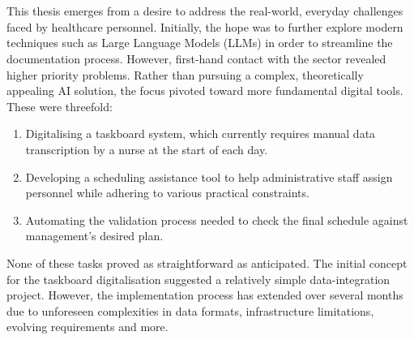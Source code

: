 \\
\\
This thesis emerges from a desire to address the real-world, everyday challenges faced by healthcare personnel. Initially, the hope was to further explore modern techniques such as Large Language Models (LLMs) in order to streamline the documentation process. However, first-hand contact with the sector revealed higher priority problems. Rather than pursuing a complex, theoretically appealing AI solution, the focus pivoted toward more fundamental digital tools. These were threefold:
\begin{enumerate}
    \item Digitalising a taskboard system, which currently requires manual data transcription by a nurse at the start of each day.
    \item Developing a scheduling assistance tool to help administrative staff assign personnel while adhering to various practical constraints.
    \item Automating the validation process needed to check the final schedule against management's desired plan.
\end{enumerate}
None of these tasks proved as straightforward as anticipated. The initial concept for the taskboard digitalisation suggested a relatively simple data-integration project. However, the implementation process has extended over several months due to unforeseen complexities in data formats, infrastructure limitations, evolving requirements and more.

